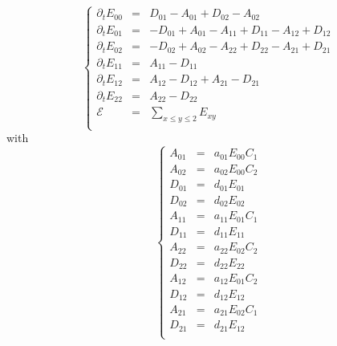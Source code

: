 \documentclass[aps,onecolumn,12pt]{revtex4}
\begin{document}
\begin{equation}
\left\lbrace
\begin{array}{rcl}
\partial_t E_{00} & = & D_{01}-A_{01} + D_{02}-A_{02}\\
\partial_t E_{01} & = & -D_{01}+A_{01} - A_{11} + D_{11} - A_{12} + D_{12}\\
\partial_t E_{02} & = & -D_{02}+A_{02} - A_{22} + D_{22} - A_{21} + D_{21}\\
\partial_t E_{11} & = & A_{11}-D_{11}\\
\partial_t E_{12} & = & A_{12}-D_{12} + A_{21}-D_{21}\\
\partial_t E_{22} & = & A_{22}-D_{22}\\
\mathcal{E}       & = & {\displaystyle \sum_{x\leq y\leq 2} E_{xy}}\\
\end{array}
\right.
\end{equation}
with
\begin{equation}
\left\lbrace
\begin{array}{rcl}
A_{01} &= &a_{01} E_{00} C_1\\
A_{02} &= &a_{02} E_{00} C_2\\
D_{01} &= &d_{01} E_{01}\\
D_{02} &= &d_{02} E_{02}\\
A_{11} &= &a_{11} E_{01} C_1 \\
D_{11} &= &d_{11} E_{11}\\
A_{22} &= &a_{22} E_{02} C_2 \\
D_{22} &= &d_{22} E_{22}\\
A_{12} & = & a_{12} E_{01} C_2\\
D_{12} & = & d_{12} E_{12}\\
A_{21} & = & a_{21} E_{02} C_1\\
D_{21} & = & d_{21} E_{12}\\
\end{array}
\right.
\end{equation}
\end{document}

